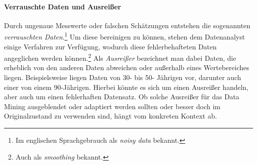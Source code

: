 \paragraph{Verrauschte Daten und Ausreißer}
Durch ungenaue Messwerte oder falschen Schätzungen entstehen die sogenannten \textit{verrauschten Daten}.\footnote{Im englischen Sprachgebrauch als \textit{noisy data} bekannt.} Um diese bereinigen zu können, stehen dem Datenanalyst einige Verfahren zur Verfügung, wodurch diese fehlerbehafteten Daten angeglichen werden können.\footnote{Auch als \textit{smoothing} bekannt.} Als \textit{Ausreißer} bezeichnet man dabei Daten, die erheblich von den anderen Daten abweichen oder außerhalb eines Wertebereiches liegen. Beispielsweise liegen Daten von 30- bis 50- Jährigen vor, darunter auch einer von einem 90-Jährigen. Hierbei könnte es sich um einen Ausreißer handeln, aber auch um einen fehlerhaften Datensatz. \glqq Ob solche Ausreißer für das Data Mining ausgeblendet oder adaptiert werden sollten oder besser doch im Originalzustand zu verwenden sind, hängt vom konkreten Kontext ab.\grqq{}


